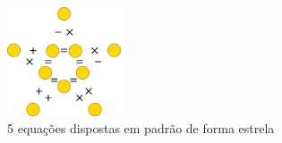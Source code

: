 \begin{figure}[ht]
\centering
\includegraphics[width=0.3\textwidth]{figuras/template.jpg}
\caption{5 equações dispostas em padrão de forma estrela}
\label{fig: gold_star_example}
\end{figure}